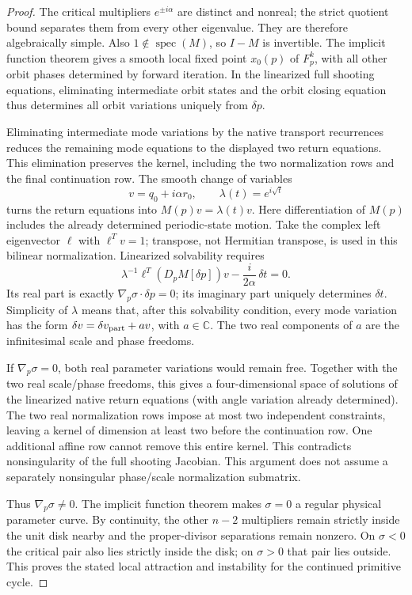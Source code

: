 \documentclass[11pt,letterpaper]{article}
\begin{document}
\begin{proof}
The critical multipliers $e^{\pm i\alpha}$ are distinct and nonreal; the
strict quotient bound separates them from every other eigenvalue. They are
therefore algebraically simple. Also $1\notin\operatorname{spec}(M)$, so
$I-M$ is invertible. The implicit function theorem gives a smooth local
fixed point $x_0(p)$ of $F_p^k$, with all other orbit phases determined by
forward iteration. In the linearized full shooting equations, eliminating
intermediate orbit states and the orbit closing equation thus determines
all orbit variations uniquely from $\delta p$.

Eliminating intermediate mode variations by the native transport recurrences
reduces the remaining mode equations to the displayed two return equations.
This elimination preserves the kernel, including the two normalization rows
and the final continuation row. The smooth change of variables
\[
 v=q_0+i\alpha r_0,\qquad \lambda(t)=e^{i\sqrt t}
\]
turns the return equations into $M(p)v=\lambda(t)v$.
Here differentiation of $M(p)$ includes the already determined periodic-state
motion. Take the complex left eigenvector $\ell$ with $\ell^Tv=1$; transpose,
not Hermitian transpose, is used in this bilinear normalization. Linearized
solvability requires
\[
 \lambda^{-1}\ell^T(D_pM[\delta p])v
       -\frac{i}{2\alpha}\,\delta t=0.
\]
Its real part is exactly $\nabla_p\sigma\cdot\delta p=0$; its imaginary part
uniquely determines $\delta t$. Simplicity of $\lambda$ means that, after
this solvability condition, every mode variation has the form
$\delta v=\delta v_{\rm part}+a v$, with $a\in\mathbb C$.
The two real components of $a$ are the infinitesimal scale and phase freedoms.

If $\nabla_p\sigma=0$, both real parameter variations would remain free.
Together with the two real scale/phase freedoms, this gives a four-dimensional
space of solutions of the linearized native return equations (with angle
variation already determined). The two real normalization rows impose at
most two independent constraints, leaving a kernel of dimension at least
two before the continuation row. One additional affine row cannot remove
this entire kernel. This contradicts nonsingularity of the full shooting
Jacobian. This argument does not assume a separately nonsingular phase/scale
normalization submatrix.

Thus $\nabla_p\sigma\ne0$. The implicit function theorem makes $\sigma=0$
a regular physical parameter curve. By continuity, the other $n-2$
multipliers remain strictly inside the unit disk nearby and the proper-divisor
separations remain nonzero. On $\sigma<0$ the critical pair also lies strictly
inside the disk; on $\sigma>0$ that pair lies outside. This proves the stated
local attraction and instability for the continued primitive cycle.
\end{proof}
\end{document}
